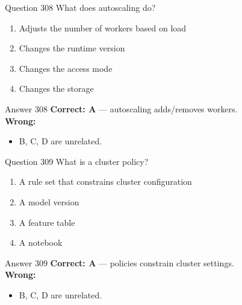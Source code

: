 \documentclass[aspectratio=169,11pt]{beamer}
\begin{document}
	\begin{frame}{Question 308}
		What does autoscaling do?
		\begin{enumerate}[label=\Alph*.]
			\item Adjusts the number of workers based on load
			\item Changes the runtime version
			\item Changes the access mode
			\item Changes the storage
		\end{enumerate}
	\end{frame}
	\begin{frame}{Answer 308}
		\textbf{Correct: A} --- autoscaling adds/removes workers.\\
		\vspace{0.5em}
		\textbf{Wrong:}
		\begin{itemize}
			\item B, C, D are unrelated.
		\end{itemize}
	\end{frame}
	
	\begin{frame}{Question 309}
		What is a cluster policy?
		\begin{enumerate}[label=\Alph*.]
			\item A rule set that constrains cluster configuration
			\item A model version
			\item A feature table
			\item A notebook
		\end{enumerate}
	\end{frame}
	\begin{frame}{Answer 309}
		\textbf{Correct: A} --- policies constrain cluster settings.\\
		\vspace{0.5em}
		\textbf{Wrong:}
		\begin{itemize}
			\item B, C, D are unrelated.
		\end{itemize}
	\end{frame}
	
\end{document}
